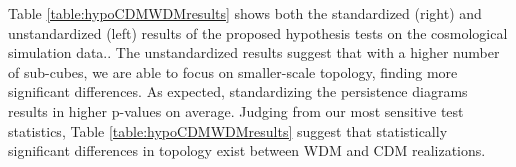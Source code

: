 \documentclass[12pt]{article}
\begin{document}



Table \ref{table:hypoCDMWDMresults} shows both the standardized (right) and unstandardized (left) results of the proposed hypothesis tests on the cosmological simulation data.. The unstandardized results suggest that with a higher number of sub-cubes, we are able to focus on smaller-scale topology, finding more significant differences. 
%
As expected, standardizing the persistence diagrams results in higher p-values on average. 
Judging from our most sensitive test statistics, Table \ref{table:hypoCDMWDMresults} suggest that statistically significant differences in topology exist between WDM and CDM realizations.
\end{document}
